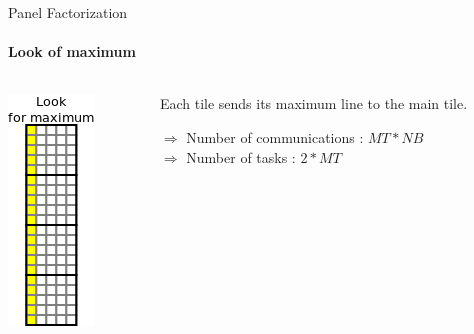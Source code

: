 \documentclass{beamer}
\begin{document}
\begin{frame}{Panel Factorization}
\framesubtitle{Look of maximum}
\begin{columns}
\begin{column}{.30\textwidth}
\begin{center}
\includegraphics[scale=0.8]{panel_max.png}
\end{center}
\end{column}
\hfill
\begin{column}{.70\textwidth}
Each tile sends its maximum line to the main tile.
\begin{center}
\begin{exampleblock}{}
$\Longrightarrow$ Number of communications : $MT*NB$\\
$\Longrightarrow$ Number of tasks : $2*MT$
\end{exampleblock}{}
\end{center}
\end{column}
\end{columns}
\end{frame}
\end{document}
